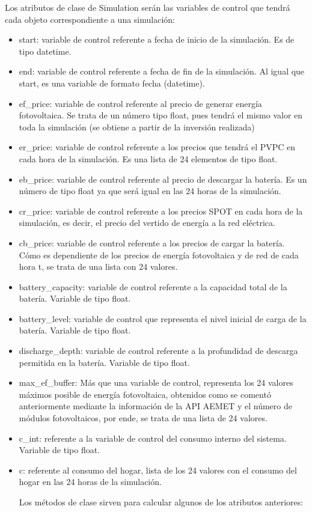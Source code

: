 Los atributos de clase de Simulation serán las variables de control que tendrá cada objeto correspondiente a una simulación:
\begin{itemize}
        \item start: variable de control referente a fecha de inicio de la simulación. Es de tipo datetime.
        \item end: variable de control referente a fecha de fin de la simulación. Al igual que start, es una variable de formato fecha (datetime).
        \item ef\_price: variable de control referente al precio de generar energía fotovoltaica. Se trata de un número tipo float, pues tendrá el mismo valor en toda la simulación (se obtiene a partir de la inversión realizada)
        \item er\_price: variable de control referente a los precios que tendrá el PVPC en cada hora de la simulación. Es una lista de 24 elementos de tipo float.
        \item eb\_price: variable de control referente al precio de descargar la batería. Es un número de tipo float ya que será igual en las 24 horas de la simulación.
        \item cr\_price: variable de control referente a los precios SPOT en cada hora de la simulación, es decir, el precio del vertido de energía a la red eléctrica.
        \item cb\_price: variable de control referente a los precios de cargar la batería. Cómo es dependiente de los precios de energía fotovoltaica y de red de cada hora t, se trata de una lista con 24 valores.
        \item battery\_capacity: variable de control referente a la capacidad total de la batería. Variable de tipo float.
        \item battery\_level: variable de control que representa el nivel inicial de carga de la batería. Variable de tipo float.
        \item discharge\_depth: variable de control referente a la profundidad de descarga permitida en la batería. Variable de tipo float.
        \item max\_ef\_buffer: Más que una variable de control, representa los 24 valores máximos posible de energía fotovoltaica, obtenidos como se comentó anteriormente mediante la información de la API AEMET y el número de módulos fotovoltaicos, por ende, se trata de una lista de 24 valores.
        \item c\_int: referente a la variable de control del consumo interno del sistema. Variable de tipo float.
        \item c: referente al consumo del hogar, lista de los 24 valores con el consumo del hogar en las 24 horas de la simulación.

Los métodos de clase sirven para calcular algunos de los atributos anteriores:
\end{itemize}

